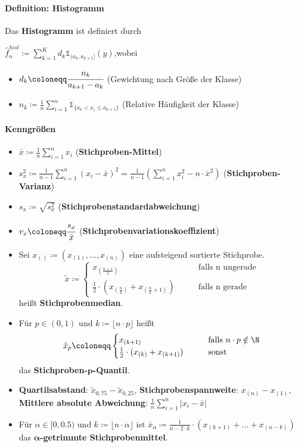 \newpage
\paragraph{Definition: Histogramm}
Das \textbf{Histogramm} ist definiert durch
\begin{tightcenter}
	$\hat{f}_n^{hist}\coloneqq\sum\limits_{k=1}^{K}d_k\mathds{1}_{(a_k,a_{k+1}]}(y)$,\qquad wobei
	\begin{itemize}
		\item $d_k\coloneqq\cfrac{n_k}{a_{k+1}-a_k}$ (Gewichtung nach Größe der Klasse)
		\item $n_k\coloneqq\frac{1}{n}\sum\limits_{i=1}^{n}\mathds{1}_{\{a_k<x_i\leq a_{k+1}\}}$ (Relative Häufigkeit der Klasse)
	\end{itemize}
\end{tightcenter}

\paragraph{Kenngrößen}
\begin{itemize}
	\item $\bar{x}\coloneqq\frac{1}{n}\sum\limits_{i=1}^{n}x_i$ \qquad(\textbf{Stichproben-Mittel})
	\item $s_x^2\coloneqq\frac{1}{n-1}\sum\limits_{i=1}^{n}(x_i-\bar{x})^2=\frac{1}{n-1}(\sum\limits_{i=1}^{n}x_i^2-n\cdot\bar{x}^2)$ \qquad(\textbf{Stichproben-Varianz})
	\item $s_x\coloneqq\sqrt{s_x^2}$ \qquad(\textbf{Stichprobenstandardabweichung})
	\item $v_x\coloneqq\cfrac{s_x}{\bar{x}}$ \qquad(\textbf{Stichprobenvariationskoeffizient})
	\item Sei $x_{()}\coloneqq(x_{(1)},\ldots,x_{(n)})$ eine aufsteigend sortierte Stichprobe.
	\[   
	\tilde{x}\coloneqq
	\begin{cases}
		x_{(\frac{n+1}{2})} & \qquad\text{falls n ungerade}\\
		\frac{1}{2}\cdot(x_{(\frac{n}{2})}+x_{(\frac{n}{2}+1)}) & \qquad\text{falls n gerade}
	\end{cases}
	\]
	heißt \textbf{Stichprobenmedian}.
	\item Für $p\in(0,1)$ und $k\coloneqq\lfloor n\cdot p\rfloor$ heißt
	\[   
	\tilde{x}_p\coloneqq
	\begin{cases}
		x_{(k+1)} & \qquad\text{falls }n\cdot p\notin\N\\
		\frac{1}{2}\cdot(x_{(k)}+x_{(k+1)}) & \qquad\text{sonst}
	\end{cases}
	\]
	das \textbf{Stichproben-$\boldsymbol{p}$-Quantil}.
	\item \textbf{Quartilsabstand}: $\tilde{x}_{0,75}-\tilde{x}_{0,25}$, \textbf{Stichprobenspannweite}: $x_{(n)}-x_{(1)}$,\\
	\textbf{Mittlere absolute Abweichung}: $\frac{1}{n}\sum\limits_{i=1}^{n}|x_i-\bar{x}|$
	\item Für $\alpha\in[0,0.5)$ und $k\coloneqq\lfloor n\cdot \alpha\rfloor$ ist $\bar{x}_\alpha\coloneqq\frac{1}{n-2\cdot k}\cdot(x_{(k+1)}+\ldots+x_{(n-k)})$ das \textbf{$\boldsymbol{\alpha}$-getrimmte Stichprobenmittel}.
\end{itemize}

